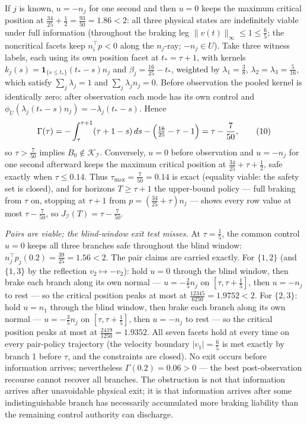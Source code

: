 \documentclass[10pt,twocolumn]{article}
\theoremstyle{plain}
\theoremstyle{definition}
\theoremstyle{remark}
\begin{document}
If \(j\) is known, \(u = -n_j\) for one second and then \(u = 0\) keeps the
maximum critical position at \(\tfrac{34}{25} + \tfrac12 =
\tfrac{93}{50} = 1.86 < 2\): all three physical states are indefinitely
viable under full information (throughout the braking leg
\(\|v(t)\|_\infty \le 1 \le \tfrac65\); the noncritical facets keep
\(n_i^\top p < 0\) along the \(n_j\)-ray; \(-n_j \in U\)). Take three witness labels, each using its own position facet at
\(t_* = \tau + 1\), with kernels
\(k_j(s) = \mathbf{1}_{\{s \le t_*\}} (t_* - s) n_j\) and
\(\beta_j = \tfrac{16}{25} - t_*\), weighted by \(\lambda_1 = \tfrac38\),
\(\lambda_2 = \lambda_3 = \tfrac{5}{16}\), which satisfy \(\sum_j \lambda_j = 1\) and \(\sum_j \lambda_j n_j =
0\). Before observation the pooled kernel is
identically zero; after observation each mode has its own control and
\(\phi_U(\lambda_j (t_* - s) n_j) = -\lambda_j (t_* - s)\). Hence
\[
\Gamma(\tau) = -\int_\tau^{\tau+1} (\tau + 1 - s)\, ds
- \Bigl(\tfrac{16}{25} - \tau - 1\Bigr) = \tau - \frac{7}{50},
\tag{10}
\]
so \(\tau > \tfrac{7}{50}\) implies
\(B_0 \notin \mathcal{K}_{\mathcal{I}}\). Conversely, \(u = 0\) before
observation and \(u = -n_j\) for one second afterward keeps the maximum
critical position at \(\tfrac{34}{25} + \tau + \tfrac12\), safe exactly when
\(\tau \le 0.14\). Thus \(\tau_{\max} = \tfrac{7}{50} = 0.14\) is exact (equality viable:
the safety set is closed), and for horizons \(T \ge \tau + 1\) the
upper-bound policy --- full braking from \(\tau\) on, stopping at
\(\tau + 1\) from \(p = (\tfrac{34}{25} + \tau)n_j\) --- shows every row
value at most \(\tau - \tfrac{7}{50}\), so
\(J_{\mathcal{I}}(T) = \tau - \tfrac{7}{50}\).

\emph{Pairs are viable; the blind-window exit test misses.} At
\(\tau = \tfrac15\), the common control \(u = 0\) keeps all three branches
safe throughout the blind window:
\(n_j^\top p_j(0.2) = \tfrac{39}{25} = 1.56 < 2\). The pair claims are
carried exactly. For \(\{1,2\}\) (and \(\{1,3\}\) by the reflection
\(v_2 \mapsto -v_2\)): hold \(u = 0\) through the blind window, then
brake each branch along its own normal --- \(u = -\tfrac25 n_j\) on
\([\tau, \tau + \tfrac15]\), then \(u = -n_j\) to rest --- so the
critical position peaks at most at \(\tfrac{12345}{6250} = 1.9752 < 2\).
For \(\{2,3\}\): hold \(u = n_1\) through the blind window, then brake
each branch along its own normal --- \(u = -\tfrac35 n_j\) on
\([\tau, \tau + \tfrac15]\), then \(u = -n_j\) to rest --- so the
critical position peaks at most at \(\tfrac{2419}{1250} = 1.9352\). All seven facets hold at every time on every pair-policy
trajectory (the velocity boundary \(|v_1| = \tfrac65\) is met exactly by
branch 1 before \(\tau\), and the constraints are closed). No exit occurs
before information arrives; nevertheless \(\Gamma(0.2) = 0.06 > 0\) --- the best
post-observation recourse cannot recover all branches. The obstruction is
not that information arrives after unavoidable physical exit; it is that
information arrives after some indistinguishable branch has necessarily
accumulated more braking liability than the remaining control authority can
discharge.
\end{document}
